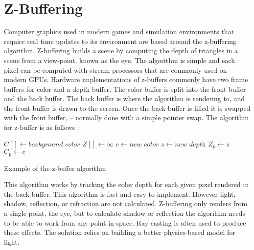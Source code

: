 \section{Z-Buffering}

Computer graphics used in modern games and simulation environments that require real time updates to its environment are based around the z-buffering algorithm.  Z-buffering builds a scene by computing the depth of triangles in a scene from a view-point,  known as the eye.  The algorithm is simple and each pixel can be computed with stream processors that are commonly  used on modern GPUs.  Hardware implementations of z-buffers commonly have two frame buffers for color and a depth buffer.    The color buffer is split into the front buffer and the back buffer.  The back buffer is where the algorithm is rendering to, and the front buffer is drawn to the screen.  Once the back buffer is filled it is swapped with the front buffer,  -- normally done with a simple pointer swap.  The algorithm for z-buffer is as follows \cite{fast:2008}:

\begin{algorithm}
\begin{algorithmic}[1]
\STATE $C[ ] \gets \textit{background color}$ 
\STATE $Z[ ] \gets \infty$
		\STATE $c \gets \textit{new color}$
		\STATE $z \gets \textit{new depth}$
			\STATE $Z_{p} \gets z$
			\STATE $C_{p} \gets c$
		\ENDIF
	\ENDFOR
\ENDFOR
\end{algorithmic}
\caption{Example of the z-buffer algorithm}
\label{z-buffer}
\end{algorithm}

This algorithm works by tracking the color depth for each given pixel rendered in the back buffer.  This algorithm is fast and easy to implement.  However light, shadow, reflection, or refraction are not calculated.   Z-buffering only renders from a single point, the eye, but to calculate shadow or reflection the algorithm needs to be able to work from any point in space.  Ray casting is often used to produce these effects.  The solution relies on building a better physics-based model for light.
